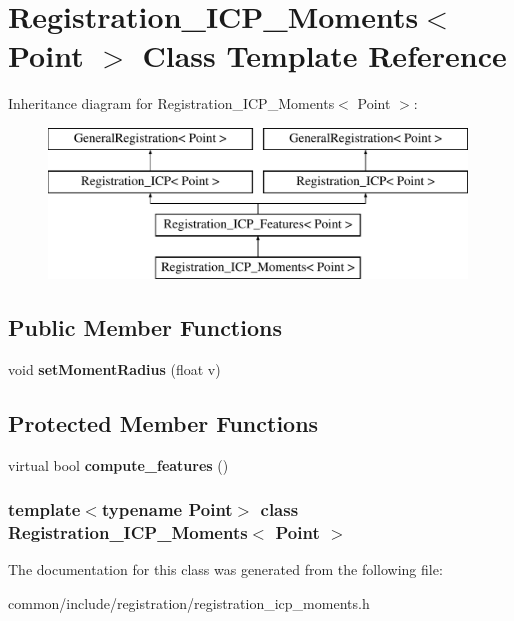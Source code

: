 \hypertarget{classRegistration__ICP__Moments}{
\section{Registration\_\-ICP\_\-Moments$<$ Point $>$ Class Template Reference}
\label{classRegistration__ICP__Moments}
}
Inheritance diagram for Registration\_\-ICP\_\-Moments$<$ Point $>$:\begin{figure}[H]
\begin{center}
\leavevmode
\includegraphics[height=4.000000cm]{classRegistration__ICP__Moments}
\end{center}
\end{figure}
\subsection*{Public Member Functions}
\begin{DoxyCompactItemize}
\item 
\hypertarget{classRegistration__ICP__Moments_a8c90e2d906e9a1ce411ffd07ec76de74}{
void {\bfseries setMomentRadius} (float v)}
\label{classRegistration__ICP__Moments_a8c90e2d906e9a1ce411ffd07ec76de74}

\end{DoxyCompactItemize}
\subsection*{Protected Member Functions}
\begin{DoxyCompactItemize}
\item 
\hypertarget{classRegistration__ICP__Moments_afbdef80f70c26b3cb6843144cc48a36a}{
virtual bool {\bfseries compute\_\-features} ()}
\label{classRegistration__ICP__Moments_afbdef80f70c26b3cb6843144cc48a36a}

\end{DoxyCompactItemize}
\subsubsection*{template$<$typename Point$>$ class Registration\_\-ICP\_\-Moments$<$ Point $>$}



The documentation for this class was generated from the following file:\begin{DoxyCompactItemize}
\item 
common/include/registration/registration\_\-icp\_\-moments.h\end{DoxyCompactItemize}

